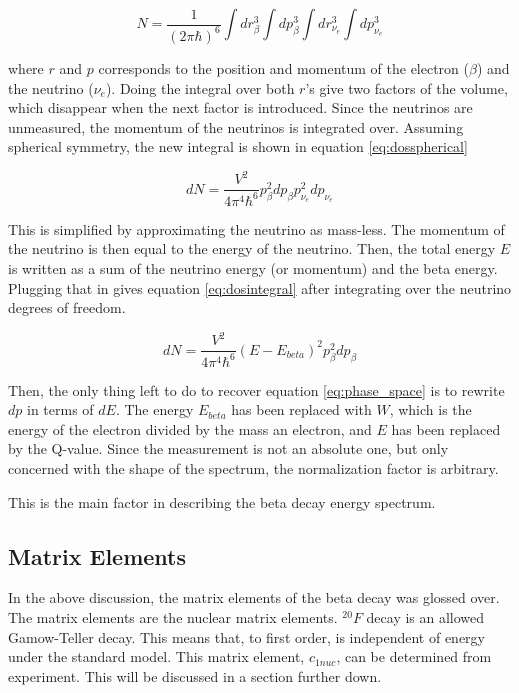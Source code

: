 \begin{equation}
	N = \frac{1}{(2\pi\hbar)^{6}}\int dr^{3}_{\beta} \int dp^{3}_{\beta}\int dr^{3}_{\nu_{e}} \int dp^{3}_{\nu_{e}} 
	\label{eq:densityofstates}
\end{equation}

where $r$ and $p$ corresponds to the position and momentum of the electron ($\beta$) and the neutrino ($\nu_{e}$).
Doing the integral over both $r$'s give two factors of the volume, which disappear when the next factor is introduced.
Since the neutrinos are unmeasured, the momentum of the neutrinos is integrated over. 
Assuming spherical symmetry, the new integral is shown in equation \ref{eq:dosspherical}

\begin{equation}
	dN = \frac{V^{2}}{4\pi^{4}\hbar^{6}}p_{\beta}^{2}dp_{\beta}p_{\nu_{e}}^{2}dp_{\nu_{e}}
	\label{eq:dosspherical}
\end{equation}

This is simplified by approximating the neutrino as mass-less.
The momentum of the neutrino is then equal to the energy of the neutrino.
Then, the total energy $E$ is written as a sum of the neutrino energy (or momentum) and the beta energy.
Plugging that in gives equation \ref{eq:dosintegral} after integrating over the neutrino degrees of freedom. 

\begin{equation}
	dN = \frac{V^{2}}{4\pi^{4}\hbar^{6}}(E - E_{beta})^{2}p_{\beta}^{2}dp_{\beta}
	\label{eq:dosintegral}
\end{equation}

Then, the only thing left to do to recover equation \ref{eq:phase_space} is to rewrite $dp$ in terms of $dE$. 
The energy $E_{beta}$ has been replaced with $W$, which is the energy of the electron divided by the mass an electron, and $E$ has been replaced by the Q-value.
Since the measurement is not an absolute one, but only concerned with the shape of the spectrum, the normalization factor is arbitrary.

This is the main factor in describing the beta decay energy spectrum.

\subsection{Matrix Elements}
In the above discussion, the matrix elements of the beta decay was glossed over.
The matrix elements are the nuclear matrix elements.
$^{20}F$ decay is an allowed Gamow-Teller decay.
This means that, to first order, is independent of energy under the standard model.
This matrix element, $c_{1nuc}$, can be determined from experiment.
This will be discussed in a section further down.

